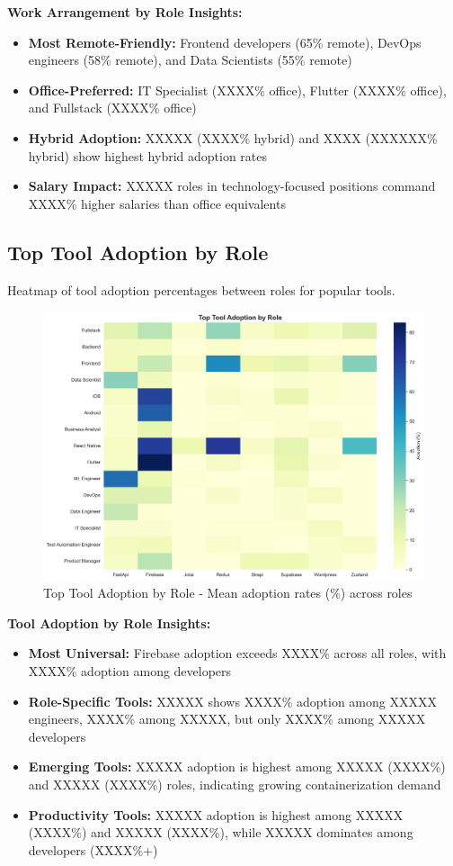 \documentclass[12pt,a4paper]{article}
\begin{document}
\textbf{Work Arrangement by Role Insights:}
\begin{itemize}
    \item \textbf{Most Remote-Friendly:} Frontend developers (65\% remote), DevOps engineers (58\% remote), and Data Scientists (55\% remote)
    \item \textbf{Office-Preferred:} IT Specialist (XXXX\% office), Flutter (XXXX\% office), and Fullstack (XXXX\% office)
    \item \textbf{Hybrid Adoption:} XXXXX (XXXX\% hybrid) and XXXX (XXXXXX\% hybrid) show highest hybrid adoption rates
    \item \textbf{Salary Impact:} XXXXX roles in technology-focused positions command XXXX\% higher salaries than office equivalents
\end{itemize}

\subsection{Top Tool Adoption by Role}
Heatmap of tool adoption percentages between roles for popular tools.

\begin{figure}[H]
    \centering
    \includegraphics[width=\textwidth]{figures/heatmap_tool_adoption_by_role.png}
    \caption{Top Tool Adoption by Role - Mean adoption rates (\%) across roles}
\end{figure}

\textbf{Tool Adoption by Role Insights:}
\begin{itemize}
    \item \textbf{Most Universal:} Firebase adoption exceeds XXXX\% across all roles, with XXXX\% adoption among developers
    \item \textbf{Role-Specific Tools:} XXXXX shows XXXX\% adoption among XXXXX engineers, XXXX\% among XXXXX, but only XXXX\% among XXXXX developers
    \item \textbf{Emerging Tools:} XXXXX adoption is highest among XXXXX (XXXX\%) and XXXXX (XXXX\%) roles, indicating growing containerization demand
    \item \textbf{Productivity Tools:} XXXXX adoption is highest among XXXXX (XXXX\%) and XXXXX (XXXX\%), while XXXXX dominates among developers (XXXX\%+)
\end{itemize}
\end{document}
